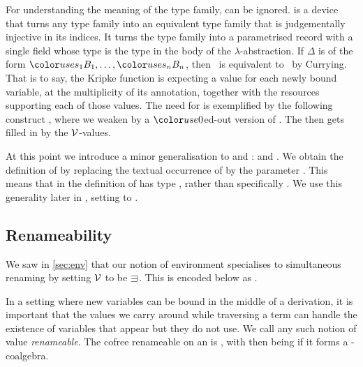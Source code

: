 For understanding the meaning of the type family,  can be
ignored.
 is a device that turns any type family into an equivalent
type family that is judgementally injective in its indices.
It turns the type family into a parametrised record with a single field
 whose type is the type in the body of the $\lambda$-abstraction.
If $\Delta$ is of the form $\gr{s_1}B_1, \ldots, \gr{s_n}B_n$, then
\ is equivalent to
\ by Currying.
That is to say, the Kripke function is expecting a value for each newly bound
variable, at the multiplicity of its annotation, together with the resources
supporting each of those values.
The need for  is exemplified by the following construct
, where we weaken \AgdaBound{$\Gamma$} by a $\gr0$ed-out
version of \AgdaBound{$\Delta$}.
The \AgdaBound{$\Delta$} then gets filled in by the $\mathcal V$-values.

 At this point we introduce a minor generalisation to 
and :
\AgdaSpace{} and
\AgdaSpace{}.
We obtain the definition of \AgdaSpace{}
by replacing the textual occurrence of  by the parameter
.
This means that  in the definition of  has
type , rather than specifically .
We use this generality later in , setting 
to .

\subsection{Renameability}

We saw in \cref{sec:env} that our notion of environment specialises to
simultaneous renaming by setting $\mathcal V$ to be $\sqni$.
This is encoded below as
.


In a setting where new variables can be bound in the middle of a derivation,
it is important that the values we carry around while traversing a term can
handle the existence of variables that appear but they do not use.
We call any such notion of value \emph{renameable}.
The cofree renameable  on an 
 is \AgdaSpace{}, with
 then being  if it forms a
-coalgebra.

